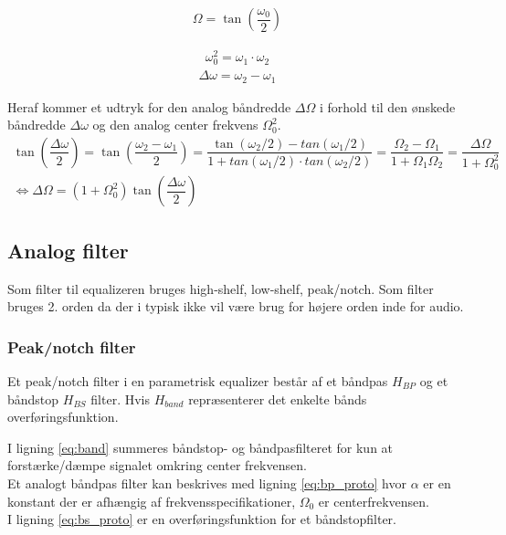     \begin{align}
    \Omega = \tan\left(  \dfrac{\omega_0}{2} \right) 
    \end{align}

    \begin{align}
        \omega_0^2 = \omega_1 \cdot \omega_2 
    \end{align}
    \begin{align}
        \Delta \omega = \omega_2 - \omega_1
    \end{align}

    Heraf kommer et udtryk for den analog båndredde $\Delta \Omega$ i forhold til den ønskede båndredde $\Delta \omega$ og den analog center frekvens $\Omega_0^2$.
\begin{align}
    \tan \left( \dfrac{\Delta \omega}{2} \right) = \tan \left( \dfrac{\omega_2 - \omega_1}{2} \right) = \dfrac{\tan(\omega_2/2) - tan(\omega_1/2)}{1 + tan(\omega_1/2) \cdot tan(\omega_2/2)} = \dfrac{\Omega_2 - \Omega_1}{1 + \Omega_1 \Omega_2} = \dfrac{\Delta \Omega}{1 + \Omega_0^2}\\
    \iff \Delta \Omega = (1 + \Omega_0^2) \tan \left( \dfrac{\Delta \omega}{2} \right)
\end{align}


    \subsection{Analog filter}

    Som filter til equalizeren bruges high-shelf, low-shelf, peak/notch.
    Som filter bruges 2. orden da der i typisk ikke vil være brug for højere orden
     inde for audio. 



     \subsubsection{Peak/notch filter}


     Et peak/notch filter i en parametrisk equalizer består af et båndpas $H_{BP}$ og et båndstop $H_{BS}$ filter. Hvis
    $H_{band}$ repræsenterer det enkelte bånds overføringsfunktion.

    I ligning \ref{eq:band} summeres båndstop- og båndpasfilteret for kun
    at forstærke/dæmpe signalet omkring center frekvensen.\\
    Et analogt båndpas filter kan beskrives med ligning \ref{eq:bp_proto} 
    hvor $\alpha$ er en konstant der er afhængig af frekvensspecifikationer, $\Omega_0$ er centerfrekvensen.\\
    I ligning \ref{eq:bs_proto} er en overføringsfunktion for et båndstopfilter.


